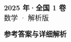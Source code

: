 \documentclass[zihao=-4, a4paper]{ctexart}
\begin{document}
\begin{center}
  {\Large\bfseries 2025 年·全国 1 卷}\\[4pt]
  {\large 数学 · 解析版}
\end{center}
\medskip
{}

\clearpage
{}
\begin{center}{\Large\bfseries 参考答案与详细解析}\end{center}
\medskip

\end{document}
